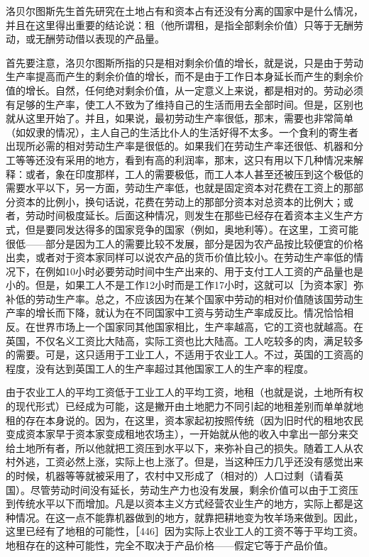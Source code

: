 洛贝尔图斯先生首先研究在土地占有和资本占有还没有分离的国家中是什么情况，并且在这里得出重要的结论说：租（他所谓租，是指全部剩余价值）只等于无酬劳动，或无酬劳动借以表现的产品量。

首先要注意，洛贝尔图斯所指的只是相对剩余价值的增长，就是说，只是由于劳动生产率提高而产生的剩余价值的增长，而不是由于工作日本身延长而产生的剩余价值的增长。自然，任何绝对剩余价值，从一定意义上来说，都是相对的。劳动必须有足够的生产率，使工人不致为了维持自己的生活而用去全部时间。但是，区别也就从这里开始了。并且，如果说，最初劳动生产率很低，那末，需要也非常简单（如奴隶的情况），主人自己的生活比仆人的生活好得不太多。一个食利的寄生者出现所必需的相对劳动生产率是很低的。如果我们在劳动生产率还很低、机器和分工等等还没有采用的地方，看到有高的利润率，那末，这只有用以下几种情况来解释：或者，象在印度那样，工人的需要极低，而工人本人甚至还被压到这个极低的需要水平以下，另一方面，劳动生产率低，也就是固定资本对花费在工资上的那部分资本的比例小，换句话说，花费在劳动上的那部分资本对总资本的比例大；或者，劳动时间极度延长。后面这种情况，则发生在那些已经存在着资本主义生产方式，但是要同发达得多的国家竞争的国家（例如，奥地利等）。在这里，工资可能很低——部分是因为工人的需要比较不发展，部分是因为农产品按比较便宜的价格出卖，或者对于资本家同样可以说农产品的货币价值比较小。在劳动生产率低的情况下，在例如10小时必要劳动时间中生产出来的、用于支付工人工资的产品量也是小的。但是，如果工人不是工作12小时而是工作17小时，这就可以［为资本家］弥补低的劳动生产率。总之，不应该因为在某个国家中劳动的相对价值随该国劳动生产率的增长而下降，就认为在不同国家中工资与劳动生产率成反比。情况恰恰相反。在世界市场上一个国家同其他国家相比，生产率越高，它的工资也就越高。在英国，不仅名义工资比大陆高，实际工资也比大陆高。工人吃较多的肉，满足较多的需要。可是，这只适用于工业工人，不适用于农业工人。不过，英国的工资高的程度，没有达到英国工人的生产率超过其他国家工人的生产率的程度。

由于农业工人的平均工资低于工业工人的平均工资，地租（也就是说，土地所有权的现代形式）已经成为可能，这是撇开由土地肥力不同引起的地租差别而单单就地租的存在本身说的。因为，在这里，资本家起初按照传统（因为旧时代的租地农民变成资本家早于资本家变成租地农场主），一开始就从他的收入中拿出一部分来交给土地所有者，所以他就把工资压到水平以下，来弥补自己的损失。随着工人从农村外逃，工资必然上涨，实际上也上涨了。但是，当这种压力几乎还没有感觉出来的时候，机器等等就被采用了，农村中又形成了（相对的）人口过剩（请看英国）。尽管劳动时间没有延长，劳动生产力也没有发展，剩余价值可以由于工资压到传统水平以下而增加。凡是以资本主义方式经营农业生产的地方，实际上都是这种情况。在这一点不能靠机器做到的地方，就靠把耕地变为牧羊场来做到。因此，这里已经有了地租的可能性，［446］因为实际上农业工人的工资不等于平均工资。地租存在的这种可能性，完全不取决于产品价格——假定它等于产品价值。

